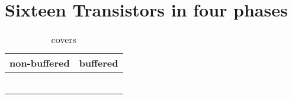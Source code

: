 \section{Sixteen Transistors in four phases}

\begin{table}[ht]
\centering
\caption*{covers}

\begin{tabular}{cc}
    \toprule
    non-buffered & buffered \\
    \midrule

    \nameref{cell:AOOAAOI2123} & \nameref{cell:AOOAAO2123} \\
    \nameref{cell:OAAOOAI2123} & \nameref{cell:OAAOOA2123} \\
    \nameref{cell:AAOAAOI2213} & \nameref{cell:AAOAAO2213} \\
    \nameref{cell:OOAOOAI2213} & \nameref{cell:OOAOOA2213} \\
    \nameref{cell:AAOOAAOI2222} & \nameref{cell:AAOOAAO2222} \\
    \nameref{cell:OOAAOOAI2222} & \nameref{cell:OOAAOOA2222}

\end{tabular}

\end{table}

 
 
 
 
 
 
